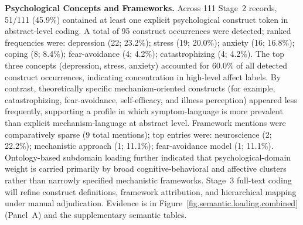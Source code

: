 \par\medskip
\noindent\textbf{Psychological Concepts and Frameworks.} Across 111 Stage~2 records, 51/111 (45.9\%) contained at least one explicit psychological construct token in abstract-level coding. A total of 95 construct occurrences were detected; ranked frequencies were: depression (22; 23.2\%); stress (19; 20.0\%); anxiety (16; 16.8\%); coping (8; 8.4\%); fear-avoidance (4; 4.2\%); catastrophizing (4; 4.2\%). The top three concepts (depression, stress, anxiety) accounted for 60.0\% of all detected construct occurrences, indicating concentration in high-level affect labels. By contrast, theoretically specific mechanism-oriented constructs (for example, catastrophizing, fear-avoidance, self-efficacy, and illness perception) appeared less frequently, supporting a profile in which symptom-language is more prevalent than explicit mechanism-language at abstract level. Framework mentions were comparatively sparse (9 total mentions); top entries were: neuroscience (2; 22.2\%); mechanistic approach (1; 11.1\%); fear-avoidance model (1; 11.1\%). Ontology-based subdomain loading further indicated that psychological-domain weight is carried primarily by broad cognitive-behavioral and affective clusters rather than narrowly specified mechanistic frameworks. Stage~3 full-text coding will refine construct definitions, framework attribution, and hierarchical mapping under manual adjudication. Evidence is in Figure~\ref{fig.semantic.loading.combined} (Panel~A) and the supplementary semantic tables.
